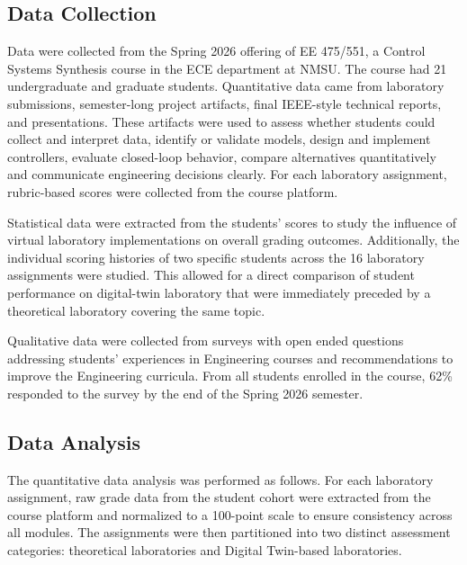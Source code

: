 \documentclass[journal]{IEEEtran}
\begin{document}
\subsection{Data Collection}
Data were collected from the Spring 2026 offering of EE
475/551, a Control Systems Synthesis course in the ECE department at NMSU. The course had 21 undergraduate and graduate students. Quantitative data came from laboratory submissions, semester-long project artifacts, final IEEE-style technical reports, and presentations. These artifacts were used to assess whether students could collect and interpret data, identify or validate models, design and implement controllers, evaluate closed-loop behavior, compare alternatives quantitatively and communicate engineering decisions clearly. For each laboratory assignment, rubric-based scores were collected from the course platform.

%
Statistical data were extracted from the students' scores to study the influence of virtual laboratory implementations on overall grading outcomes. Additionally, the individual scoring histories of two specific students across the 16 laboratory assignments were studied. This allowed for a direct comparison of student performance on digital-twin laboratory that were immediately preceded by a theoretical laboratory covering the same topic.
%

Qualitative data were collected from surveys with open ended questions addressing students' experiences in Engineering courses and recommendations to improve the Engineering curricula. From all students enrolled in the course, 62\% responded to the survey by the end of the Spring 2026 semester.  

\subsection{Data Analysis}
The quantitative data analysis was performed as follows. For each laboratory assignment, raw grade data from the student cohort were extracted from the course platform and normalized to a 100-point scale to ensure consistency across all modules. The assignments were then partitioned into two distinct assessment categories: theoretical laboratories and Digital Twin-based laboratories.
\end{document}
